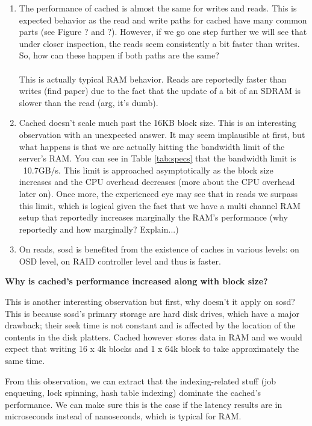 \begin{enumerate}
	\item The performance of cached is almost the same for writes and reads.  
		This is expected behavior as the read and write paths for cached have 
		many common parts (see Figure ? and ?). However, if we go one step 
		further we will see that under closer inspection, the reads seem 
		consistently a bit faster than writes. So, how can these happen if both 
		paths are the same? \\
		\\
		This is actually typical RAM behavior. Reads are reportedly faster than 
		writes (find paper) due to the fact that the update of a bit of an 
		SDRAM is slower than the read (arg, it's dumb).
	\item Cached doesn't scale much past the 16KB block size. This is an 
		interesting observation with an unexpected answer. It may seem 
		implausible at first, but what happens is that we are actually hitting 
		the bandwidth limit of the server's RAM. You can see in Table 
		\ref{tab:specs} that the bandwidth limit is ~10.7GB/s. This limit is 
		approached asymptotically as the block size increases and the CPU 
		overhead decreases (more about the CPU overhead later on). Once more, 
		the experienced eye may see that in reads we surpass this limit, which 
		is logical given the fact that we have a multi channel RAM setup that 
		reportedly increases marginally the RAM's performance (why reportedly 
		and how marginally? Explain...)
	\item On reads, sosd is benefited from the existence of caches in various 
		levels: on OSD level, on RAID controller level and thus is faster.
\end{enumerate}

\textbf{Why is cached's performance increased along with block size?}

This is another interesting observation but first, why doesn't it apply on 
sosd? This is because sosd's primary storage are hard disk drives, which have a 
major drawback; their seek time is not constant and is affected by the location 
of the contents in the disk platters. Cached however stores data in RAM and we 
would expect that writing 16 x 4k blocks and 1 x 64k block to take 
approximately the same time.

From this observation, we can extract that the indexing-related stuff (job 
enqueuing, lock spinning, hash table indexing) dominate the cached's 
performance. We can make sure this is the case if the latency results are in
microseconds instead of nanoseconds, which is typical for RAM.

